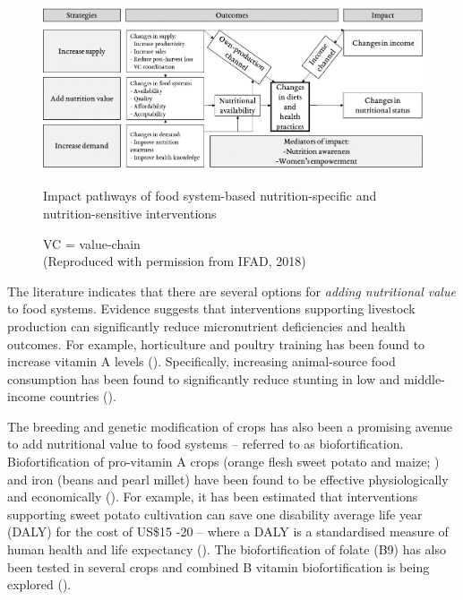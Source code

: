 \begin{figure}[H]
\includegraphics[width=1\textwidth]{figs_07/IFAD_frameworkv2.png}
  \captionsetup{singlelinecheck = false, justification=justified} %
  \caption{Impact pathways of food system-based nutrition-specific and nutrition-sensitive interventions}
  \label{fig:07_3}
  \vspace*{-3mm}
  \caption*{VC = value-chain \\
 	(Reproduced with permission from IFAD, 2018)}
\end{figure}



The literature indicates that there are several options for \textit{adding nutritional value} to food systems. Evidence suggests that interventions supporting livestock production can significantly reduce micronutrient deficiencies and health outcomes. For example, horticulture and poultry training has been found to increase vitamin A levels (\citealp{Masters2018}). Specifically, increasing animal-source food consumption has been found to significantly reduce stunting in low and middle-income countries (\citealp{Headey2018}).

The breeding and genetic modification of crops has also been a promising avenue to add nutritional value to food systems -- referred to as biofortification. Biofortification of pro-vitamin A crops (orange flesh sweet potato and maize; \citealp{Bouis2017}) and iron (beans and pearl millet) have been found to be effective physiologically and economically (\citealp{Osendarp2018}). For example, it has been estimated that interventions supporting sweet potato cultivation can save one disability average life year (DALY) for the cost of US\$15 -20 -- where a DALY is a standardised measure of human health and life expectancy (\citealp{Osendarp2018}). The biofortification of folate (B9) has also been tested in several crops and combined B vitamin biofortification is being explored (\citealp{Strobbe2018}).

